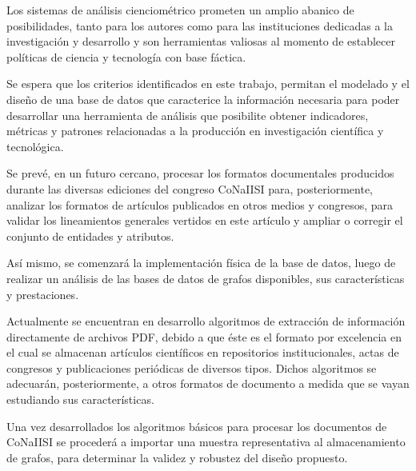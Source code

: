 Los sistemas de análisis cienciométrico prometen un amplio abanico de posibilidades, tanto para los autores como para las instituciones dedicadas a la investigación y desarrollo y son herramientas valiosas al momento de establecer políticas de ciencia y tecnología con base fáctica.

Se espera que los criterios identificados en este trabajo, permitan el modelado y el diseño de una base de datos que caracterice la información necesaria para poder desarrollar una herramienta de análisis que posibilite obtener indicadores, métricas y patrones relacionadas a la producción en investigación científica y tecnológica. 

Se prevé, en un futuro cercano, procesar los formatos documentales producidos durante las diversas ediciones del congreso CoNaIISI para, posteriormente, analizar los formatos de artículos publicados en otros medios y congresos, para validar los lineamientos generales vertidos en este artículo y ampliar o corregir el conjunto de entidades y atributos.

Así mismo, se comenzará la implementación física de la base de datos, luego de realizar un análisis de las bases de datos de grafos disponibles, sus características y prestaciones.

Actualmente se encuentran en desarrollo algoritmos de extracción de información directamente de archivos PDF, debido a que éste es el formato por excelencia en el cual se almacenan artículos científicos en repositorios institucionales, actas de congresos y publicaciones periódicas de diversos tipos. Dichos algoritmos se adecuarán, posteriormente, a otros formatos de documento a medida que se vayan estudiando sus características.

Una vez desarrollados los algoritmos básicos para procesar los documentos de CoNaIISI se procederá a importar una muestra representativa al almacenamiento de grafos, para determinar la validez y robustez del diseño propuesto.
